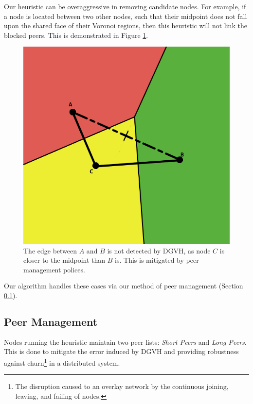 \documentclass[11pt, conference, letterpaper]{IEEEtran}
\begin{document}
Our heuristic can be overaggressive in removing candidate nodes.
For example, if a node is located between two other nodes, such that their midpoint does not fall upon the shared face of their Voronoi regions, then this heuristic will not link the blocked peers.
This is demonstrated in Figure \ref{occ-ex}.
\begin{figure}
	\centering
	\includegraphics[width=\linewidth]{occlusion}
	\caption{The edge between $A$ and $B$ is not detected by DGVH, as node $C$ is closer to the midpoint than $B$ is.  This is mitigated by peer management polices.}  %
	\label{occ-ex}
\end{figure}
Our algorithm handles these cases via our method of peer management (Section \ref{sec:manage}).






\subsection{Peer Management}
\label{sec:manage}
Nodes running the heuristic maintain two peer lists: \textit{Short Peers} and \textit{Long Peers}.
This is done to  mitigate the error induced by DGVH and providing robustness against churn\footnote{The disruption caused to an overlay network by the continuous joining, leaving, and failing of nodes.} in a distributed system.
\end{document}
